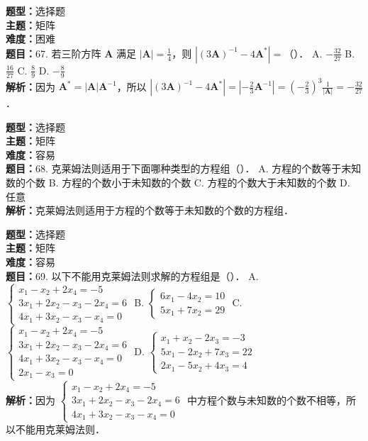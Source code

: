 \documentclass{ctexart}
\newenvironment{question}[5]{%
	\noindent\textbf{题型：}#1\\
	\textbf{主题：}#2\\
	\textbf{难度：}#3\\
	\textbf{题目：}#4\\
	\textbf{解析：}#5\\
	\vspace{1em}
}{}
\begin{document}
	\begin{question}
		{选择题}
		{矩阵}
		{困难}
		{67. 若三阶方阵 \(\mathbf{A}\) 满足 \(|\mathbf{A}|=\frac{1}{4}\)，则 \(\left|(3 \mathbf{A})^{-1}-4 \mathbf{A}^*\right|=\)（）．
			A. \(-\frac{32}{27}\)
			B. \(\frac{16}{27}\)
			C. \(\frac{8}{9}\)
			D. \(-\frac{8}{9}\)}
		{因为 \(\mathbf{A}^*=|\mathbf{A}| \mathbf{A}^{-1}\)，所以 \(\left|(3 \mathbf{A})^{-1}-4 \mathbf{A}^*\right|=\left|-\frac{2}{3} \mathbf{A}^{-1}\right|=\left(-\frac{2}{3}\right)^3 \frac{1}{|\mathbf{A}|}=-\frac{32}{27}\)．}
	\end{question}
	
	\begin{question}
		{选择题}
		{矩阵}
		{容易}
		{68. 克莱姆法则适用于下面哪种类型的方程组（）．
			A. 方程的个数等于末知数的个数
			B. 方程的个数小于未知数的个数
			C. 方程的个数大于未知数的个数
			D. 任意}
		{克莱姆法则适用于方程的个数等于未知数的个数的方程组．}
	\end{question}
	
	\begin{question}
		{选择题}
		{矩阵}
		{容易}
		{69. 以下不能用克莱姆法则求解的方程组是（）．
			A. \(\left\{\begin{array}{l}x_1-x_2+2 x_4=-5 \\ 3 x_1+2 x_2-x_3-2 x_4=6 \\ 4 x_1+3 x_2-x_3-x_4=0\end{array}\right.\)
			B. \(\left\{\begin{array}{l}6 x_1-4 x_2=10 \\ 5 x_1+7 x_2=29\end{array}\right.\)
			C. \(\left\{\begin{array}{l}x_1-x_2+2 x_4=-5 \\ 3 x_1+2 x_2-x_3-2 x_4=6 \\ 4 x_1+3 x_2-x_3-x_4=0 \\ 2 x_1-x_3=0\end{array}\right.\)
			D. \(\left\{\begin{array}{l}x_1+x_2-2 x_3=-3 \\ 5 x_1-2 x_2+7 x_3=22 \\ 2 x_1-5 x_2+4 x_3=4\end{array}\right.\)}
		{因为 \(\left\{\begin{array}{l}x_1-x_2+2 x_4=-5 \\ 3 x_1+2 x_2-x_3-2 x_4=6 \\ 4 x_1+3 x_2-x_3-x_4=0\end{array}\right.\) 中方程个数与未知数的个数不相等，所以不能用克莱姆法则．}
	\end{question}
	
\end{document}
